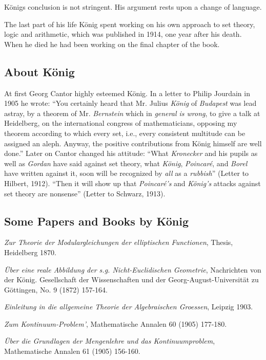 \documentclass[12pt]{article}
\begin{document}
K\"onigs conclusion is not stringent. His argument rests upon a change
of language.

The last part of his life K\"onig spent working on his own approach to
set theory, logic and arithmetic, which was published in 1914, one
year after his death. When he died he had been working on the final
chapter of the book.

\subsection{About K\"onig}

At first Georg Cantor highly esteemed K\"onig. In a letter to Philip
Jourdain in 1905 he wrote: ``You certainly heard that Mr. Julius
\emph{K\"onig} of \emph{Budapest} was lead astray, by a theorem of
Mr. \emph{Bernstein} which in \emph{general is wrong}, to give a talk
at Heidelberg, on the international congress of mathematicians,
opposing my theorem according to which every set, i.e., every
consistent multitude can be assigned an aleph. Anyway, the positive
contributions from K\"onig himself are well done.'' Later on Cantor
changed his attitude: ``What \emph{Kronecker} and his pupils as well
as \emph{Gordan} have said against set theory, what \emph{K\"onig},
\emph{Poincar\'e}, and \emph{Borel} have written against it, soon will
be recognized by \emph{all} as a \emph{rubbish}'' (Letter to Hilbert,
1912). ``Then it will show up that \emph{Poincar\'e's} and
\emph{K\"onig's} attacks against set theory are nonsense'' (Letter to
Schwarz, 1913).

\subsection{Some Papers and Books by K\"onig} 
\emph{Zur Theorie der Modulargleichungen der elliptischen Functionen},
Thesis, Heidelberg 1870.

\emph{\"Uber eine reale Abbildung der s.g. Nicht-Euclidischen
Geometrie}, Nachrichten von der K\"onig. Gesellschaft der
Wissenschaften und der Georg-August-Universit\"at zu G\"ottingen, No. 9
(1872) 157-164.

\emph{Einleitung in die allgemeine Theorie der Algebraischen
Groessen}, Leipzig 1903.

\emph{Zum Kontinuum-Problem'}, Mathematische Annalen 60 (1905)
177-180.

\emph{\"Uber die Grundlagen der Mengenlehre und das Kontinuumproblem},
Mathematische Annalen 61 (1905) 156-160.
\end{document}
